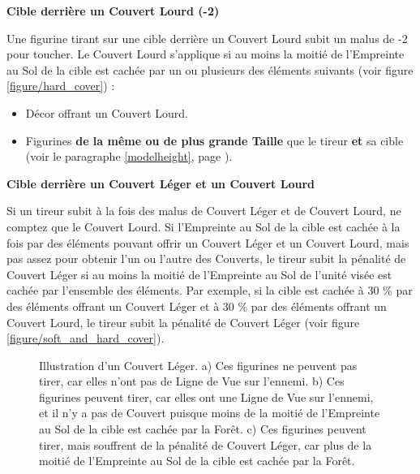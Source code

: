 \noindent\textbf{Cible derrière un Couvert Lourd (-2)}

Une figurine tirant sur une cible derrière un Couvert Lourd subit un malus de -2 pour toucher. Le Couvert Lourd s'applique si au moins la moitié de l'Empreinte au Sol de la cible est cachée par un ou plusieurs des éléments suivants (voir figure \ref{figure/hard_cover}) :
\begin{itemize}[label={-}]
\item Décor offrant un Couvert Lourd.
\item Figurines \textbf{de la même ou de plus grande Taille} que le tireur \textbf{et} sa cible (voir le paragraphe \ref{modelheight}, page \pageref{modelheight}).
\end{itemize}

\noindent\textbf{Cible derrière un Couvert Léger et un Couvert Lourd}

Si un tireur subit à la fois des malus de Couvert Léger et de Couvert Lourd, ne comptez que le Couvert Lourd. Si l'Empreinte au Sol de la cible est cachée à la fois par des éléments pouvant offrir un Couvert Léger et un Couvert Lourd, mais pas assez pour obtenir l'un ou l'autre des Couverts, le tireur subit la pénalité de Couvert Léger si au moins la moitié de l'Empreinte au Sol de l'unité visée est cachée par l'ensemble des éléments. Par exemple, si la cible est cachée à 30 \% par des éléments offrant un Couvert Léger et à 30 \% par des éléments offrant un Couvert Lourd, le tireur subit la pénalité de Couvert Léger (voir figure \ref{figure/soft_and_hard_cover}).

\newcommand{\figureSCNotinlightofsight}{\normalfontsize{\textit{Pas de Ligne de Vue}}}
\newcommand{\figureSCForest}{Forêt}
\newcommand{\figureSCFire}{\smallfontsize{\textit{Feu !}}}
\newcommand{\figureSCA}{a)}
\newcommand{\figureSCB}{b)}
\newcommand{\figureSCC}{c)}
\newcommand{\figureSCWithinlightofsight}{\normalfontsize{\textit{Ligne de Vue !}}}
\newcommand{\figureSCLessthanhalfoffootprintobscured}{\normalfontsize{\textit{Moins de 50 \% cachée}}}
\newcommand{\figureSCMorethanhalfoffootprintobscured}{\normalfontsize{\textit{Plus de 50 \% cachée}}}

\vspace*{1.5cm}

\begin{figure}[!htbp]
\centering
\def\svgwidth{\textwidth}

\caption{Illustration d'un Couvert Léger.\vspace*{10pt}\newline
a) Ces figurines ne peuvent pas tirer, car elles n'ont pas de Ligne de Vue sur l'ennemi.\vspace*{10pt}\newline
b) Ces figurines peuvent tirer, car elles ont une Ligne de Vue sur l'ennemi, et il n'y a pas de Couvert puisque moins de la moitié de l'Empreinte au Sol de la cible est cachée par la Forêt.\vspace*{10pt}\newline
c) Ces figurines peuvent tirer, mais souffrent de la pénalité de Couvert Léger, car plus de la moitié de l'Empreinte au Sol de la cible est cachée par la Forêt.}
\label{figure/soft_cover}
\end{figure}

